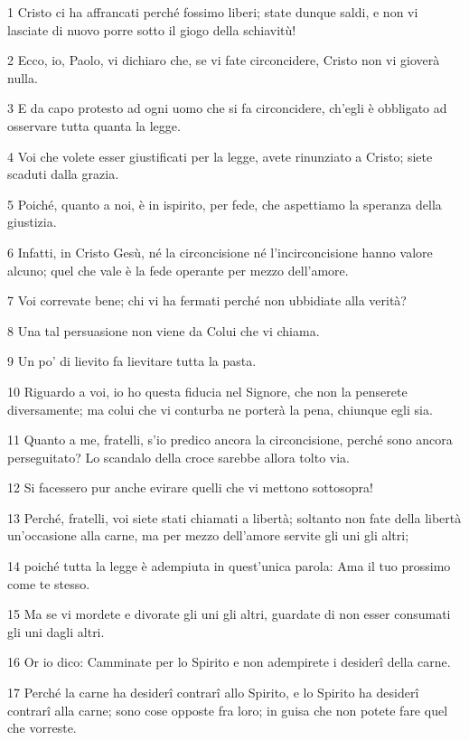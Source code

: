 \par 1 Cristo ci ha affrancati perché fossimo liberi; state dunque saldi, e non vi lasciate di nuovo porre sotto il giogo della schiavitù!
\par 2 Ecco, io, Paolo, vi dichiaro che, se vi fate circoncidere, Cristo non vi gioverà nulla.
\par 3 E da capo protesto ad ogni uomo che si fa circoncidere, ch'egli è obbligato ad osservare tutta quanta la legge.
\par 4 Voi che volete esser giustificati per la legge, avete rinunziato a Cristo; siete scaduti dalla grazia.
\par 5 Poiché, quanto a noi, è in ispirito, per fede, che aspettiamo la speranza della giustizia.
\par 6 Infatti, in Cristo Gesù, né la circoncisione né l'incirconcisione hanno valore alcuno; quel che vale è la fede operante per mezzo dell'amore.
\par 7 Voi correvate bene; chi vi ha fermati perché non ubbidiate alla verità?
\par 8 Una tal persuasione non viene da Colui che vi chiama.
\par 9 Un po' di lievito fa lievitare tutta la pasta.
\par 10 Riguardo a voi, io ho questa fiducia nel Signore, che non la penserete diversamente; ma colui che vi conturba ne porterà la pena, chiunque egli sia.
\par 11 Quanto a me, fratelli, s'io predico ancora la circoncisione, perché sono ancora perseguitato? Lo scandalo della croce sarebbe allora tolto via.
\par 12 Si facessero pur anche evirare quelli che vi mettono sottosopra!
\par 13 Perché, fratelli, voi siete stati chiamati a libertà; soltanto non fate della libertà un'occasione alla carne, ma per mezzo dell'amore servite gli uni gli altri;
\par 14 poiché tutta la legge è adempiuta in quest'unica parola: Ama il tuo prossimo come te stesso.
\par 15 Ma se vi mordete e divorate gli uni gli altri, guardate di non esser consumati gli uni dagli altri.
\par 16 Or io dico: Camminate per lo Spirito e non adempirete i desiderî della carne.
\par 17 Perché la carne ha desiderî contrarî allo Spirito, e lo Spirito ha desiderî contrarî alla carne; sono cose opposte fra loro; in guisa che non potete fare quel che vorreste.
